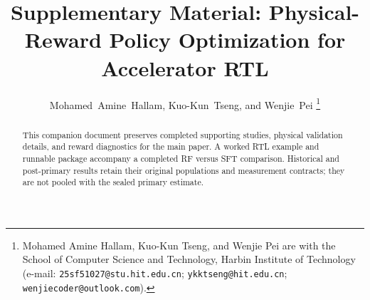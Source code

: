 \documentclass[journal]{IEEEtran}
\begin{document}
\title{Supplementary Material: Physical-Reward Policy Optimization for Accelerator RTL}
\author{Mohamed~Amine~Hallam, Kuo-Kun~Tseng, and Wenjie~Pei%
\thanks{Mohamed Amine Hallam, Kuo-Kun Tseng, and Wenjie Pei are with the
School of Computer Science and Technology, Harbin Institute of Technology
(e-mail: \texttt{25sf51027@stu.hit.edu.cn}; \texttt{ykktseng@hit.edu.cn};
\texttt{wenjiecoder@outlook.com}).}%
}
\maketitle
\begin{abstract}
This companion document preserves completed supporting studies, physical
validation details, and reward diagnostics for the main paper. A worked RTL
example and runnable package accompany a completed RF versus SFT comparison.
Historical and
post-primary results retain their original populations and measurement
contracts; they are not pooled with the sealed primary estimate.
\end{abstract}





\end{document}
